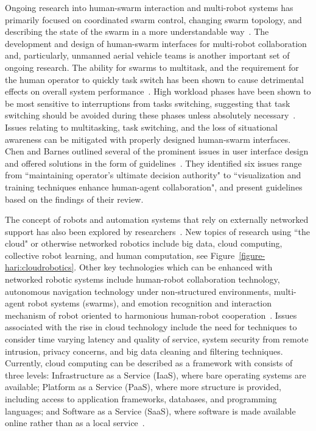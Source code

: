 Ongoing research into human-swarm interaction and multi-robot systems has primarily focused on coordinated swarm control, changing swarm topology, and describing the state of the swarm in a more understandable way~\citep{wang_current_2018}.
The development and design of human-swarm interfaces for multi-robot collaboration and, particularly, unmanned aerial vehicle teams is another important set of ongoing research.
The ability for swarms to multitask, and the requirement for the human operator to quickly task switch has been shown to cause detrimental effects on overall system performance~\citep{chen_humanagent_2014}.
High workload phases have been shown to be most sensitive to interruptions from tasks switching, suggesting that task switching should be avoided during these phases unless absolutely necessary~\citep{norman_user_1986}.
Issues relating to multitasking, task switching, and the loss of situational awareness can be mitigated with properly designed human-swarm interfaces.
Chen and Barnes outlined several of the prominent issues in user interface design and offered solutions in the form of guidelines~\citep{chen_humanagent_2014}.
They identified six issues range from ``maintaining operator's ultimate decision authority" to ``visualization and training techniques enhance human-agent collaboration", and present guidelines based on the findings of their review.

The concept of robots and automation systems that rely on externally networked support has also been explored by researchers~\citep{kehoe_survey_2015}.
New topics of research using ``the cloud" or otherwise networked robotics include big data, cloud computing, collective robot learning, and human computation, see Figure~\ref{figure-hari:cloudrobotics}.
Other key technologies which can be enhanced with networked robotic systems include human-robot collaboration technology, autonomous navigation technology under non-structured environments, multi-agent robot systems (swarms), and emotion recognition and interaction mechanism of robot oriented to harmonious human-robot cooperation~\citep{wang_current_2018}.
Issues associated with the rise in cloud technology include the need for techniques to consider time varying latency and quality of service, system security from remote intrusion, privacy concerns, and big data cleaning and filtering techniques.
Currently, cloud computing can be described as a framework with consists of three levels: Infrastructure as a Service (IaaS), where bare operating systems are available; Platform as a Service (PaaS), where more structure is provided, including access to application frameworks, databases, and programming languages; and Software as a Service (SaaS), where software is made available online rather than as a local service~\citep{kehoe_survey_2015}.

